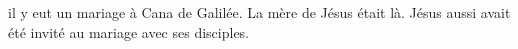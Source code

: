 \encetemps il y eut un mariage à Cana de Galilée.
La mère de Jésus était là.
	Jésus aussi avait été invité au mariage avec ses disciples.
